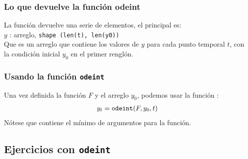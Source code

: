 \documentclass[12pt]{beamer}
\begin{document}
\begin{frame}
\frametitle{Lo que devuelve la función \textbf{odeint}}
La función  devuelve una serie de elementos, el principal es:
\\
\medskip
\pause
$y$ : arreglo, \texttt{shape (len(t), len(y0))}
\\
\medskip
Que es un arreglo que contiene los valores de $y$ para cada punto temporal $t$, con la condición inicial $y_{0}$ en el primer renglón.
\end{frame}
\begin{frame}
\frametitle{Usando la función \texttt{odeint}}
Una vez definida la función $F$ y el arreglo $y_{0}$, podemos usar la función :
\pause
\begin{align*}
y_{t} = \mbox{\texttt{odeint}} (F, y_{0}, t)
\end{align*}
Nótese que contiene el mínimo de argumentos para la función.
\end{frame}

\subsection{Ejercicios con \texttt{odeint}}
\end{document}
